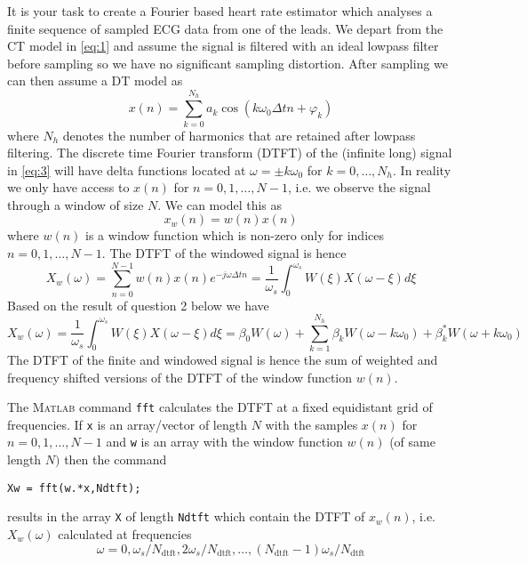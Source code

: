 \documentclass[12pt]{article}
\begin{document}
It is your task to create a Fourier based heart rate estimator which analyses a finite sequence of sampled ECG data from one of the leads. We depart from the CT model in \eqref{eq:1} and assume the signal is filtered with an ideal lowpass filter before sampling so we have no significant sampling distortion.  After sampling we can then assume a DT model as
\begin{equation}
  \label{eq:3}
  x(n) = \sum_{k=0}^{N_h} a_k \cos( k \omega_0 \Delta t n + \varphi_k)
\end{equation}
where $N_h$ denotes the number of harmonics that are retained after lowpass filtering. The discrete time Fourier transform (DTFT) of the (infinite long) signal in \eqref{eq:3} will have delta functions located at $\omega= \pm k \omega_0$ for $k=0,\ldots,N_h$. In reality we only have access to $x(n)$ for $n=0,1,\ldots,N-1$, i.e. we observe the signal through a window of size $N$. We can model this as
\begin{equation}
  \label{eq:4}
  x_w(n) = w(n) x(n) 
\end{equation}
where $w(n)$ is a window function which is non-zero only for indices $n=0,1,\ldots,N-1$.  The DTFT of the windowed signal is hence
\begin{equation}
  \label{eq:5}
  X_w(\omega) = \sum_{n=0}^{N-1} w(n) x(n) e^{-j\omega \Delta t n} = \frac{1}{\omega_s} \int_0^{\omega_s} W(\xi) X(\omega-\xi) d\xi
\end{equation}
Based on the result of question 2 below we have
\begin{equation}
  \label{eq:7}
  X_w(\omega) = \frac{1}{\omega_s} \int_0^{\omega_s} W(\xi) X(\omega-\xi) d\xi = \beta_0 W(\omega)  + \sum_{k=1}^{N_h} \beta_k W(\omega-k \omega_0)  + \beta^*_k W(\omega+k \omega_0)  
\end{equation}
The DTFT of the finite and windowed signal is hence the sum of weighted and frequency shifted versions of the DTFT of the window function $w(n)$.

The \textsc{Matlab} command \texttt{fft} calculates the DTFT at a fixed equidistant grid of frequencies. If \texttt{x} is an array/vector of length $N$ with the samples $x(n)$ for $n=0,1,\ldots,N-1$ and \texttt{w} is an array with the window function $w(n)$ (of same length $N)$ then the command
\begin{center}
\begin{verbatim}
Xw = fft(w.*x,Ndtft);
\end{verbatim}
\end{center}
results in the array \texttt{X} of length \texttt{Ndtft} which contain the DTFT of $x_w(n)$, i.e.\ $ X_w(\omega) $ calculated at frequencies $$\omega= 0, \omega_s/N_\text{dtft}, 2\omega_s/N_\text{dtft},\ldots ,(N_\text{dtft}-1) \omega_s / N_\text{dtft} $$
\end{document}
